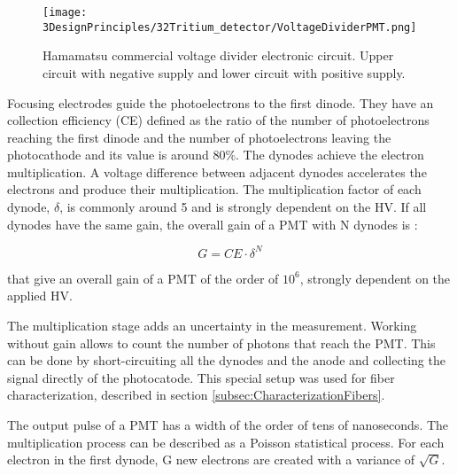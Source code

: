 \begin{enumerate}
\begin{figure}[h]
\centering
\texttt{[image: 3DesignPrinciples/32Tritium\_detector/VoltageDividerPMT.png]}
\caption{Hamamatsu commercial voltage divider electronic circuit. Upper circuit with negative supply and lower circuit with positive supply.\label{fig:VoltageDividerCircuit}~\cite{DataSheetPMTs}}
\end{figure}


Focusing electrodes guide the photoelectrons to the first dinode. They have an collection efficiency (CE) defined as the ratio of the number of photoelectrons reaching the first dinode and the number of photoelectrons leaving the photocathode and its value is around $80\%$. The dynodes achieve the electron multiplication. A voltage difference between adjacent dynodes accelerates the electrons and produce their multiplication. The multiplication factor of each dynode, $\delta$, is commonly around 5 and is strongly dependent on the HV. If all dynodes have the same gain, the overall gain of a PMT with N dynodes is \cite{Knoll}:

\begin{equation}
G = CE\cdot{} \delta^N
\label{eq:PMTGain}
\end{equation}

that give an overall gain of a PMT of the order of $10^6$, strongly dependent on the applied HV.

The multiplication stage adds an uncertainty in the measurement. Working without gain allows to count the number of photons that reach the PMT. This can be done by short-circuiting all the dynodes and the anode and collecting the signal directly of the photocatode. This special setup was used for fiber characterization, described in section \ref{subsec:CharacterizationFibers}.


\end{enumerate}

The output pulse of a PMT has a width of the order of tens of nanoseconds. The multiplication process can be described as a Poisson statistical process. For each electron in the first dynode, G new electrons are created with a variance of $\sqrt{G}$.

